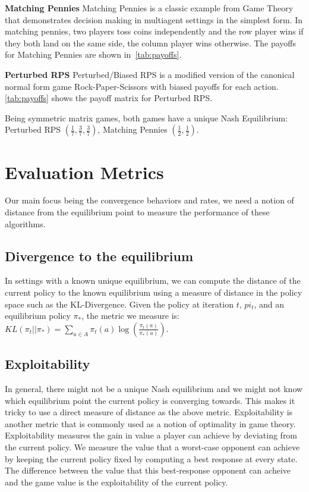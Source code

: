 \textbf{Matching Pennies}
Matching Pennies is a classic example from Game Theory that demonstrates decision making in
multiagent settings in the simplest form.
In matching pennies, two players toss coins independently and the row player wins if they both land
on the same side, the column player wins otherwise.
The payoffs for Matching Pennies are shown in~\ref{tab:payoffs}.

\textbf{Perturbed RPS}
Perturbed/Biased RPS is a modified version of the canonical normal form game Rock-Paper-Scissors
with biased payoffs for each action.
\ref{tab:payoffs} shows the payoff matrix for Perturbed RPS.

Being symmetric matrix games, both games have a unique Nash Equilibrium: Perturbed RPS
$(\frac{1}{7}, \frac{3}{7}, \frac{3}{7})$, Matching Pennies $(\frac{1}{2}, \frac{1}{2})$.

\section{Evaluation Metrics}
Our main focus being the convergence behaviors and rates, we need a notion of distance from the
equilibrium point to measure the performance of these algorithms.

\subsection{Divergence to the equilibrium}
In settings with a known unique equilibrium, we can compute the distance of the current policy to
the known equilibrium using a measure of distance in the policy space such as the KL-Divergence.
Given the policy at iteration $t$, $pi_t$, and an equilibrium policy $\pi_*$, the metric we measure
is: $KL(\pi_t || \pi_*) = \sum_{a \in A} \pi_t(a) \log \left( \frac{\pi_t(a)}{\pi_*(a)} \right)$.

\subsection{Exploitability}
In general, there might not be a unique Nash equilibrium and we might not know which equilibrium
point the current policy is converging towards.
This makes it tricky to use a direct measure of distance as the above metric.
Exploitability is another metric that is commonly used as a notion of optimality in game theory.
Exploitability measures the gain in value a player can achieve by deviating from the current
policy.
We measure the value that a worst-case opponent can achieve by keeping the current policy fixed by
computing a best response at every state.
The difference between the value that this best-response opponent can acheive and the game value is
the exploitability of the current policy.

